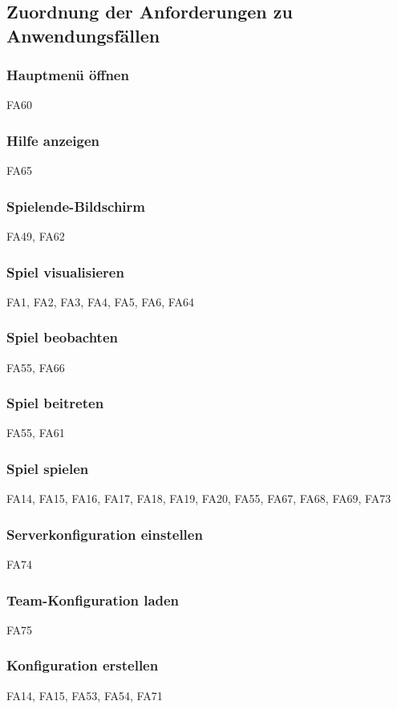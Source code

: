 \subsection{Zuordnung der Anforderungen zu Anwendungsfällen}
\subsubsection{Hauptmenü öffnen}
FA60

\subsubsection{Hilfe anzeigen}
FA65

\subsubsection{Spielende-Bildschirm}
FA49,
FA62

\subsubsection{Spiel visualisieren}
FA1,
FA2, 
FA3, 
FA4, 
FA5, 
FA6, 
FA64

\subsubsection{Spiel beobachten}
FA55,
FA66

\subsubsection{Spiel beitreten}
FA55,
FA61

\subsubsection{Spiel spielen}
FA14, 
FA15, 
FA16, 
FA17, 
FA18, 
FA19, 
FA20, 
FA55, 
FA67,
FA68, 
FA69,
FA73 

\subsubsection{Serverkonfiguration einstellen}
FA74 

\subsubsection{Team-Konfiguration laden}
FA75 

\subsubsection{Konfiguration erstellen}
FA14,
FA15, 
FA53, 
FA54, 
FA71

